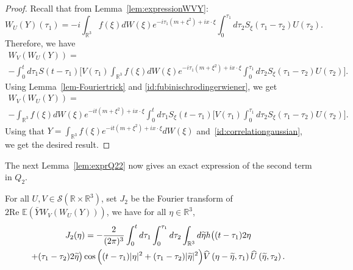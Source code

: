 \documentclass[AHL, Unicode, longabstracts,published]{cedram}
\newcommand{\R}{\mathbb{R}}
\newcommand{\E}{\mathbb{E}}
\newcommand{\mclS}{\mathcal{S}}
\let\oldtilde\tilde
\renewcommand*{\tilde}[1]{\mathchoice{\widetilde{#1}}{\widetilde{#1}}{\oldtilde{#1}}{\oldtilde{#1}}}
\let\oldhat\hat
\renewcommand*{\hat}[1]{\mathchoice{\widehat{#1}}{\widehat{#1}}{\oldhat{#1}}{\oldhat{#1}}}
\begin{document}
\begin{proof}
Recall that from Lemma~\ref{lem:expressionWVY}:
\[
W_U(Y)(\tau_1) = -i\int_{\R^3} f(\xi) dW(\xi) e^{-i\tau_1\left(m+\xi^2\right) + ix\cdot \xi} \int_{0}^{\tau_1}d\tau_2 S_\xi(\tau_1 - \tau_2) U(\tau_2).
\]
Therefore, we have
\begin{multline*}
W_V\left(W_U (Y)\right) =\\
 - \int_{0}^t d\tau_1 S(t-\tau_1) \Big[V(\tau_1) \int_{\R^3} f(\xi) dW(\xi) e^{-i\tau_1 \left(m+\xi^2\right) + ix\cdot \xi} \int_{0}^{\tau_1}d\tau_2 S_\xi(\tau_1 - \tau_2) U(\tau_2)\Big].
\end{multline*}
Using Lemma~\ref{lem-Fouriertrick} and \eqref{id:fubinischrodingerwiener}, we get
\begin{multline*}
W_V\left(W_U(Y)\right) = \\
- \int_{\R^3} f(\xi) dW(\xi) e^{-it\left(m+\xi^2\right) + ix\cdot \xi} \int_{0}^t d\tau_1 S_\xi(t-\tau_1) \Big[V(\tau_1) \int_{0}^{\tau_1} d\tau_2 S_\xi(\tau_1 - \tau_2) U(\tau_2)\Big].
\end{multline*}
Using that $Y = \int_{\R^3} f(\xi) e^{-it(m+\xi^2) + ix\cdot \xi} d W(\xi)$ and~\eqref{id:correlationgaussian}, we get the desired result.
\end{proof}


The next Lemma~\ref{lem:exprQ22} now gives an exact expression of the second term in $Q_2$.


\begin{lemm}\label{lem:exprQ22}
For all $U,V\in \mclS(\R\times \R^3)$, set $J_2$ be the Fourier transform of $2\textrm{Re }\E(\bar Y W_V(W_U(Y)))$, we have for all $\eta \in \R^3$,
\begin{multline*}
J_2(\eta) = -\frac{2}{(2\pi)^3} \int_{0}^t d\tau_1 \int_{0}^{\tau_1} d\tau_2 \int_{\R^3} d\tilde{\eta} h\big((t-\tau_1)2\eta\\
+ (\tau_1 - \tau_2) 2\tilde{\eta}\big) \cos \Big((t-\tau_1) |\eta|^2 + (\tau_1 - \tau_2) |\tilde{\eta}|^2 \Big) 
\hat V\left(\eta - \tilde{\eta}, \tau_1\right) \hat U\left(\tilde{\eta},\tau_2\right).
\end{multline*}
\end{lemm}
\end{document}
